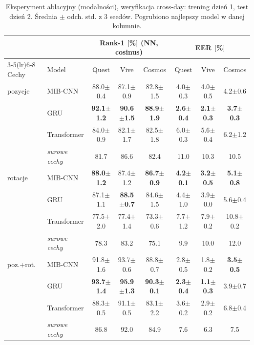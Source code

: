 \begin{table}[H]\centering\small
\caption{Eksperyment ablacyjny (modalności), weryfikacja cross-day: trening dzień 1, test dzień 2. Średnia $\pm$ odch. std. z 3 seedów. Pogrubiono najlepszy model w danej kolumnie.}\label{tab:abl_mod}
\begin{tabular}{llcccccc}
\toprule
 & & \multicolumn{3}{c}{Rank-1 [\%] (NN, cosinus)} & \multicolumn{3}{c}{EER [\%]} \\
\cmidrule(lr){3-5}\cmidrule(lr){6-8}
Cechy & Model & Quest & Vive & Cosmos & Quest & Vive & Cosmos \\
\midrule
pozycje & MIB-CNN & 88.0$\pm$0.4 & 87.1$\pm$0.9 & 82.8$\pm$1.5 & 4.0$\pm$0.3 & 4.0$\pm$0.5 & 4.2$\pm$0.6 \\
 & GRU & \textbf{92.1$\pm$1.2} & \textbf{90.6$\pm$1.5} & \textbf{88.9$\pm$1.9} & \textbf{2.6$\pm$0.4} & \textbf{2.1$\pm$0.3} & \textbf{3.7$\pm$0.3} \\
 & Transformer & 84.0$\pm$0.9 & 82.1$\pm$1.7 & 82.5$\pm$1.8 & 6.0$\pm$0.3 & 5.6$\pm$0.4 & 6.2$\pm$1.2 \\
 & \textit{surowe cechy} & 81.7 & 86.6 & 82.4 & 11.0 & 10.3 & 10.5 \\
\midrule
rotacje & MIB-CNN & \textbf{88.0$\pm$1.2} & 87.4$\pm$1.2 & \textbf{86.7$\pm$0.9} & \textbf{4.2$\pm$0.1} & \textbf{3.2$\pm$0.5} & \textbf{5.1$\pm$0.8} \\
 & GRU & 87.1$\pm$1.1 & \textbf{88.5$\pm$0.7} & 84.6$\pm$1.5 & 4.4$\pm$1.0 & 3.9$\pm$0.0 & 5.6$\pm$0.4 \\
 & Transformer & 77.5$\pm$2.0 & 77.4$\pm$1.4 & 73.3$\pm$0.6 & 7.7$\pm$1.2 & 7.9$\pm$0.2 & 10.8$\pm$0.2 \\
 & \textit{surowe cechy} & 78.3 & 83.2 & 75.1 & 9.9 & 10.0 & 12.0 \\
\midrule
poz.+rot. & MIB-CNN & 91.8$\pm$1.6 & 93.7$\pm$0.6 & 88.8$\pm$0.7 & 2.8$\pm$0.5 & 1.8$\pm$0.2 & \textbf{3.5$\pm$0.5} \\
 & GRU & \textbf{93.7$\pm$1.4} & \textbf{95.9$\pm$1.3} & \textbf{90.3$\pm$0.1} & \textbf{2.3$\pm$0.4} & \textbf{1.1$\pm$0.3} & 3.9$\pm$0.7 \\
 & Transformer & 88.3$\pm$0.5 & 91.1$\pm$0.5 & 83.1$\pm$2.2 & 3.6$\pm$0.2 & 2.9$\pm$0.2 & 6.8$\pm$0.4 \\
 & \textit{surowe cechy} & 86.8 & 92.0 & 84.9 & 7.6 & 6.3 & 7.5 \\
\bottomrule
\end{tabular}
\end{table}